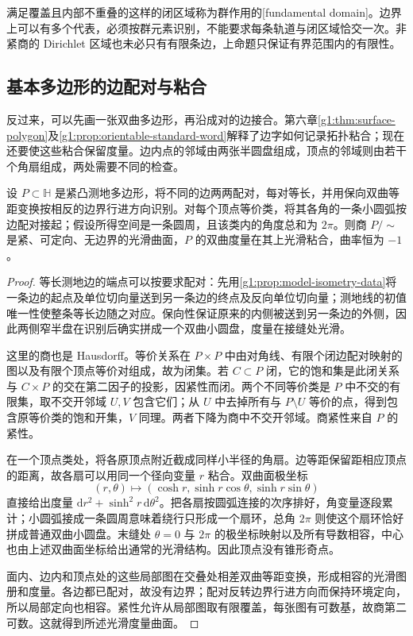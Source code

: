 满足覆盖且内部不重叠的这样的闭区域称为群作用的[fundamental domain]。边界上可以有多个代表，必须按群元素识别，不能要求每条轨道与闭区域恰交一次。非紧商的 Dirichlet 区域也未必只有有限条边，上命题只保证有界范围内的有限性。

\subsection{基本多边形的边配对与粘合}
\label{g1:subsec:1002:03}

反过来，可以先画一张双曲多边形，再沿成对的边接合。第六章\cref{g1:thm:surface-polygon}及\cref{g1:prop:orientable-standard-word}解释了边字如何记录拓扑粘合；现在还要使这些粘合保留度量。边内点的邻域由两张半圆盘组成，顶点的邻域则由若干个角扇组成，两处需要不同的检查。

\begin{proposition}\label{g1:prop:hyperbolic-polygon-gluing}
	设 \(P\subset\mathbb H\) 是紧凸测地多边形，将不同的边两两配对，每对等长，并用保向双曲等距变换按相反的边界行进方向识别。对每个顶点等价类，将其各角的一条小圆弧按边配对接起；假设所得空间是一条圆周，且该类内的角度总和为 \(2\pi\)。则商 \(P/{\sim}\) 是紧、可定向、无边界的光滑曲面，\(P\) 的双曲度量在其上光滑粘合，曲率恒为 \(-1\)。
\end{proposition}
\begin{proof}
	等长测地边的端点可以按要求配对：先用\cref{g1:prop:model-isometry-data}将一条边的起点及单位切向量送到另一条边的终点及反向单位切向量；测地线的初值唯一性使整条等长边随之对应。保向性保证原来的内侧被送到另一条边的外侧，因此两侧窄半盘在识别后确实拼成一个双曲小圆盘，度量在接缝处光滑。

	这里的商也是 Hausdorff。等价关系在 \(P\times P\) 中由对角线、有限个闭边配对映射的图以及有限个顶点等价对组成，故为闭集。若 \(C\subset P\) 闭，它的饱和集是此闭关系与 \(C\times P\) 的交在第二因子的投影，因紧性而闭。两个不同等价类是 \(P\) 中不交的有限集，取不交开邻域 \(U,V\) 包含它们；从 \(U\) 中去掉所有与 \(P\setminus U\) 等价的点，得到包含原等价类的饱和开集，\(V\) 同理。两者下降为商中不交开邻域。商紧性来自 \(P\) 的紧性。

	在一个顶点类处，将各原顶点附近截成同样小半径的角扇。边等距保留距相应顶点的距离，故各扇可以用同一个径向变量 \(r\) 粘合。双曲面极坐标
	\[
		(r,\theta)\longmapsto(\cosh r,\sinh r\cos\theta,\sinh r\sin\theta)
	\]
	直接给出度量 \(\mathrm{d}r^2+\sinh^2r\,\mathrm{d}\theta^2\)。把各扇按圆弧连接的次序排好，角变量逐段累计；小圆弧接成一条圆周意味着绕行只形成一个扇环，总角 \(2\pi\) 则使这个扇环恰好拼成普通双曲小圆盘。末缝处 \(\theta=0\) 与 \(2\pi\) 的极坐标映射以及所有导数相容，中心也由上述双曲面坐标给出通常的光滑结构。因此顶点没有锥形奇点。

	面内、边内和顶点处的这些局部图在交叠处相差双曲等距变换，形成相容的光滑图册和度量。各边都已配对，故没有边界；配对反转边界行进方向而保持环境定向，所以局部定向也相容。紧性允许从局部图取有限覆盖，每张图有可数基，故商第二可数。这就得到所述光滑度量曲面。
\end{proof}

